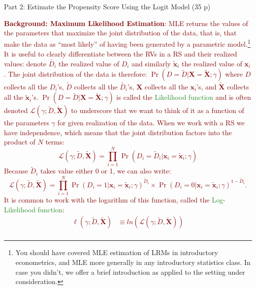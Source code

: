 \documentclass[
]{article}
\begin{document}
\begin{center}
{\LARGE Part 2: Estimate the Propensity Score Using the Logit Model (35 p)}
\end{center}

\noindent 

\textcolor{Maroon}{\textbf{Background: Maximum Likelihood Estimation}: MLE returns the values of the parameters that maximize the joint distribution of the data, that is, that make the data as ``most likely'' of having been generated by a parametric model.\footnote{You should have covered MLE estimation of LRMs in introductory econometrics, and MLE more generally in any introductory statistics class. In case you didn't, we offer a brief introduction as applied to the setting under consideration.} It is useful to clearly differentiate between the RVs in a RS and their realized values: denote $\tilde{D_i}$ the realized value of $D_i$ and similarly $\tilde{\mathbf{x}}_i$ the realized value of $\mathbf{x}_i$. The joint distribution of the data is therefore: $\Pr(D=\tilde{D}|\mathbf{X}=\tilde{\mathbf{X}};\gamma)$ where $D$ collects all the $D_i$'s, $\tilde{D}$ collects all the $\tilde{D_i}$'s, $\mathbf{X}$ collects all the $\mathbf{x}_i$'s, and $\tilde{\mathbf{X}}$ collects all the $\tilde{\mathbf{x}}_i$'s. $\Pr(D=\tilde{D}|\mathbf{X}=\tilde{\mathbf{X}};\gamma)$ is called the \textcolor{ForestGreen}{Likelihood function} and is often denoted $\mathcal{L}(\gamma; \tilde{D}, \tilde{\mathbf{X}})$ to underscore that we want to think of it as a function of the parameters $\gamma$ for given realization of the data. When we work with a RS we have independence, which means that the joint distribution factors into the product of $N$ terms: 
\begin{equation}
\mathcal{L}(\gamma; \tilde{D}, \tilde{\mathbf{X}})= \prod_{i=1}^{N}\Pr(D_i=\tilde{D}_i|\mathbf{x}_i=\tilde{\mathbf{x}}_i; \gamma)
\end{equation}
Because $\tilde{D}_i$ takes value either 0 or 1, we can also write:
\begin{equation}
\mathcal{L}(\gamma; \tilde{D}, \tilde{\mathbf{X}})= \prod_{i=1}^N\Pr(D_i=1|\mathbf{x}_i=\tilde{\mathbf{x}}_i; \gamma)^{\tilde{D}_i}\times \Pr(D_i=0|\mathbf{x}_i=\tilde{\mathbf{x}}_i; \gamma)^{1-\tilde{D}_i}.
\end{equation}
It is common to work with the logarithm of this function, called the \textcolor{ForestGreen}{Log-Likelihood function}:
\begin{equation}
\begin{aligned}
\ell(\gamma; \tilde{D}, \tilde{\mathbf{X}}) &\equiv ln(\mathcal{L}(\gamma; \tilde{D}, \tilde{\mathbf{X}})) \\

\end{aligned}
\end{equation}}
\end{document}
